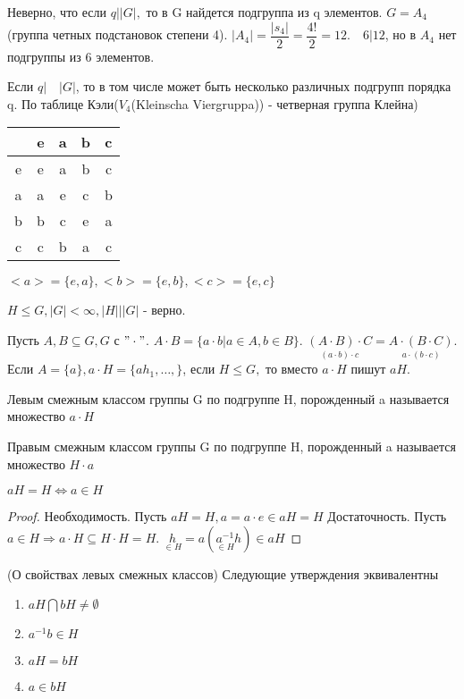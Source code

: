\begin{note}
	Неверно, что если \(q| |G|,\) то в G найдется подгруппа из q элементов. \(G = A_4\)(группа четных подстановок степени 4). \(|A_4| = \dfrac{|s_4|}{2} = \dfrac{4!}{2} = 12. \quad 6 | 12\), но в \(A_4\) нет подгруппы из 6 элементов.
\end{note}
\begin{note}
	Если \(q|\quad|G|\), то в том числе может быть несколько различных подгрупп порядка q. По таблице  Кэли(\(V_4\)(Kleinscha Viergruppa)) - четверная группа Клейна)
	\begin{tabular}{c|cccc}
		& e& a& b& c \\
		\hline 
		e  & e & a & b & c \\
		a  & a & e &c&b \\
		b  & b & c & e & a \\
		c  & c & b & a & c
	\end{tabular}
	\(<a> = \{e, a\}, <b> = \{e, b\}, <c> = \{e,c\}\)
\end{note}
\begin{note}
	\(H\le G, |G| < \infty, |H| | |G|\) - верно.
\end{note}
	Пусть \(A,B\subseteq G, G\) с \("\cdot"\). \(A\cdot B = \{a\cdot b|a\in A, b\in B\}\). \(\underset{(a\cdot b)\cdot c}{(A\cdot B)\cdot C} = \underset{a\cdot(b\cdot c)}{A\cdot(B\cdot C)}\). Если \(A=\{a\}, a\cdot H = \{ah_1, \ldots, \}\), если \(H\le G,\) то вместо \({a}\cdot H\) пишут \(aH\).
\begin{definition}
	Левым смежным классом группы G по подгруппе H, порожденный a называется множество \(a\cdot H\)
\end{definition}
\begin{definition}
	Правым смежным классом группы G по подгруппе H, порожденный a называется множество \(H\cdot a\)
\end{definition}
\begin{proposition}
	\(aH = H \Longleftrightarrow a\in H\)
\end{proposition}
\begin{proof}
	Необходимость. Пусть \(aH = H, a = a\cdot e\in aH = H\) \newline
	Достаточность. Пусть \(a\in H \Longrightarrow a\cdot H \subseteq H\cdot H = H\). \(\underset{\in H}{h} = a(\underset{\in H}{a^{-1}}h)\in aH\)
\end{proof}
\begin{proposition}
	(О свойствах левых смежных классов) \newline
	Следующие утверждения эквивалентны
	\begin{enumerate}
		\item \(aH \bigcap bH \ne \emptyset \) \\
		\item \(a^{-1}b\in H\) \\
		\item \(aH = bH\) \\
		\item \(a\in bH\)
	\end{enumerate}
\end{proposition}
